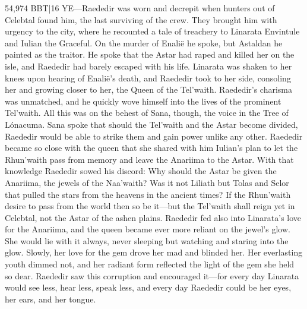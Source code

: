 \documentclass[smalldemyvopaper,11pt,twoside,onecolumn,openright,extrafontsizes]{memoir}
\begin{document}
{{54,974 BBT|16 YE—Raededir was worn and decrepit when hunters out of Celebtal found him, the last surviving of the crew. They brought him with urgency to the city, where he recounted a tale of treachery to Linarata Envintule and Iulian the Graceful. On the murder of Enalië he spoke, but Astaldan he painted as the traitor. He spoke that the Astar had raped and killed her on the isle, and Raededir had barely escaped with his life. Linarata was shaken to her knees upon hearing of Enalië’s death, and Raededir took to her side, consoling her and growing closer to her, the Queen of the Tel’waith. Raededir’s charisma was unmatched, and he quickly wove himself into the lives of the prominent Tel’waith. All this was on the behest of Sana, though, the voice in the Tree of Lónacuma. Sana spoke that should the Tel’waith and the Astar become divided, Raededir would be able to strike them and gain power unlike any other. Raededir became so close with the queen that she shared with him Iulian’s plan to let the Rhun’waith pass from memory and leave the Anariima to the Astar. With that knowledge Raededir sowed his discord: Why should the Astar be given the Anariima, the jewels of the Naa’waith? Was it not Liliath but Tolas and Selor that pulled the stars from the heavens in the ancient times? If the Rhun’waith desire to pass from the world then so be it—but the Tel’waith shall reign yet in Celebtal, not the Astar of the ashen plains. Raededir fed also into Linarata’s love for the Anariima, and the queen became ever more reliant on the jewel’s glow. She would lie with it always, never sleeping but watching and staring into the glow. Slowly, her love for the gem drove her mad and blinded her. Her everlasting youth dimmed not, and her radiant form reflected the light of the gem she held so dear. Raededir saw this corruption and encouraged it—for every day Linarata would see less, hear less, speak less, and every day Raededir could be her eyes, her ears, and her tongue. 

}}
\end{document}
